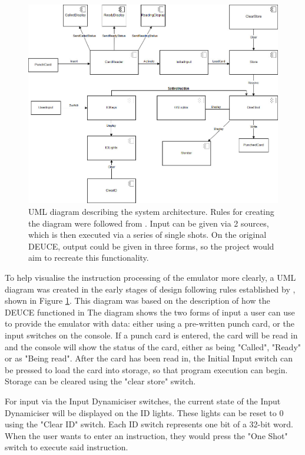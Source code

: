 \documentclass{l4proj}
\begin{document}
\begin{figure}[h]
	\centering
	\includegraphics[width=\linewidth]{images/deuce-uml}
	\caption{UML diagram describing the system architecture. Rules for creating the diagram were followed from \citet{uml18}. Input can be given via 2 sources, which is then executed via a series of single shots. On the original DEUCE, output could be given in three forms, so the project would aim to recreate this functionality.}
    \label{fig:uml}
\end{figure}
	
To help visualise the instruction processing of the emulator more clearly, a UML diagram was created in the early stages of design following rules established by \citet{uml18}, shown in Figure \ref{fig:uml}. This diagram was based on the description of how the DEUCE functioned in \citet{Vowels05}The diagram shows the two forms of input a user can use to provide the emulator with data: either using a pre-written punch card, or the input switches on the console. If a punch card is entered, the card will be read in and the console will show the status of the card, either as being "Called", "Ready" or as "Being read". After the card has been read in, the Initial Input switch can be pressed to load the card into storage, so that program execution can begin. Storage can be cleared using the "clear store" switch.
	
For input via the Input Dynamiciser switches, the current state of the Input Dynamiciser will be displayed on the ID lights. These lights can be reset to 0 using the "Clear ID" switch. Each ID switch represents one bit of a 32-bit word. When the user wants to enter an instruction, they would press the "One Shot" switch to execute said instruction.
	
\end{document}
